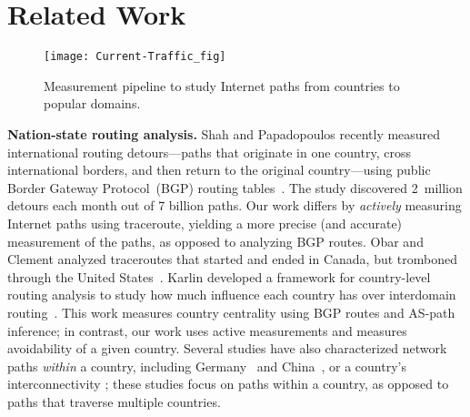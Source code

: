 \section{Related Work}
\label{related}

\begin{figure*}[t]
\centering
\texttt{[image: Current-Traffic\_fig]}
\caption{Measurement pipeline to study Internet paths from countries to
  popular domains.}
\label{fig:pipeline1}
\end{figure*}

{\bf Nation-state routing analysis.}  Shah and
Papadopoulos recently measured international routing detours---paths that originate
in
one country, cross international borders, and then return to the
original country---using public Border Gateway Protocol~(BGP) routing tables~\cite
{shah2015characterizing}. 
The study discovered 2~million detours each month out
of 7 billion paths.
Our work differs by {\em actively}
measuring Internet paths using traceroute, yielding a more precise (and accurate) measurement of the paths, %
as opposed to analyzing BGP
routes.  Obar and Clement analyzed traceroutes
that started and ended in Canada, but tromboned through the United
States~\cite{obar2012internet}. 
Karlin \ea{} developed a framework for country-level
routing analysis to study how much influence each country has over
interdomain routing~\cite{karlin2009nation}.  This work measures country
centrality using BGP routes and AS-path inference; in contrast, our work uses active 
measurements and measures avoidability of a given country. Several studies have also characterized network paths {\em
within} a country, including
Germany~\cite{wahlisch2010framework,wahlisch2012exposing} and
China~\cite{zhou2007chinese}, or a country's interconnectivity %
\cite{bischof2015and,gupta2014peering,fanou2015diversity,roberts2011mapping}; these studies
focus on paths within a country, as opposed to paths that traverse multiple countries.


